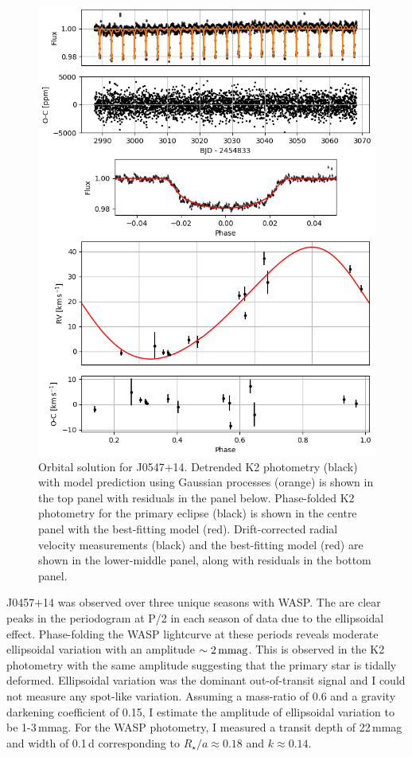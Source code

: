 \begin{figure}
    \centering
    \includegraphics[scale=0.8]{8-Results/J0457+14/orbital.png}
    \caption{ Orbital solution for J0547$+$14. Detrended K2 photometry (black) with model prediction using Gaussian processes (orange) is shown in the top panel with residuals in the panel below. Phase-folded K2 photometry for the primary eclipse (black) is shown in the centre panel with the best-fitting model (red). Drift-corrected radial velocity measurements (black) and the best-fitting model (red) are shown in the lower-middle panel, along with residuals in the bottom panel.}
    \label{fig:J0457+14:orbital}
\end{figure}

J0457$+$14 was observed over three unique seasons with WASP. The are clear peaks in the periodogram at P/2 in each season of data due to the ellipsoidal effect. Phase-folding the WASP lightcurve at these periods reveals moderate ellipsoidal variation with an amplitude $\sim 2\,\rm mmag$. This is observed in the K2 photometry with the same amplitude suggesting that the primary star is tidally deformed. Ellipsoidal variation was the dominant out-of-transit signal and I could not measure any spot-like variation. Assuming a mass-ratio of 0.6 and a gravity darkening coefficient of 0.15, I estimate the amplitude of ellipsoidal variation to be 1-3\,mmag. For the WASP photometry, I measured a transit depth of 22\,mmag and width of 0.1\,d  corresponding to $R_\star/a \approx 0.18$ and $k \approx 0.14$. 

